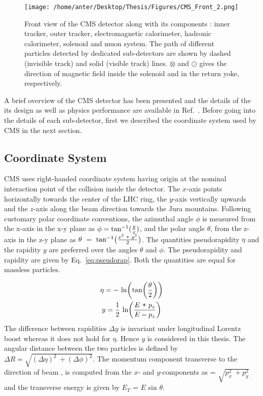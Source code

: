 \begin{figure}[!h]
\begin{center} 
\hspace*{-15mm}
\texttt{[image: /home/anter/Desktop/Thesis/Figures/CMS\_Front\_2.png]}
\caption{Front view of the CMS detector \cite{Ball:2007zza} along with its components : inner tracker, outer tracker, electromagnetic calorimeter, hadronic calorimeter, solenoid and muon system. The path of different particles detected by dedicated sub-detectors are shown by dashed (invisible track) and solid (visible track) lines. $\otimes$ and $\odot$ gives the direction of magnetic field inside the solenoid and in the return yoke, respectively.}
\label{fig:CMS_front}
\end{center}
\end{figure}

A brief overview of the CMS detector has been presented and the details of the its design as well as physics performance are available in Ref.~\cite{Bayatian:2006nff,Ball:2007zza}. Before going into the details of each sub-detector, first we described the coordinate system used by CMS in the next section.

\subsection{Coordinate System}
CMS uses right-handed coordinate system having origin at the nominal interaction point of the collision inside the detector. The $x$-axis points horizontally towards the center of the LHC ring, the $y$-axis vertically upwards and the $z$-axis along the beam direction towards the Jura mountains. Following customary polar coordinate conventions, the
azimuthal angle $\phi$ is measured from the x-axis in the x-y plane as $\phi = {\rm tan^{-1}}(\frac{y}{x})$, and the polar angle $\theta$, from the z-axis in the z-y plane as $\theta~=~{\rm tan^{-1}}\big(\frac{x^2~\plus y^2}{2}\big)$. The quantities pseudorapidity $\eta$ and the rapidity $y$ are preferred over the angles $\theta$ and $\phi$. The pseudorapidity and rapidity are given by Eq.~\ref{eq:pseudorap}. Both the quantities are equal for massless particles.

\begin{equation}
\begin{gathered}
\eta = -~{\rm ln}\bigg({\rm tan}\bigg(\frac{\theta}{2}\bigg)\bigg)\\
y = \frac{1}{2}~{\rm ln} \bigg(\frac{E~\plus p_z}{E - p_z} \bigg)
\end{gathered}
\label{eq:pseudorap}
\end{equation}
The difference between rapidities $\Delta y$ is invariant under longitudinal Lorentz boost whereas it does not hold for $\eta$. Hence $y$ is considered in this thesis. The angular distance between the two particles is defined by $\Delta R = \sqrt{(\Delta \eta)^2~\plus (\Delta \phi)^2}$. The momentum component transverse to the direction of beam \pt, is computed from the $x$- and $y$-components as \pt = $\sqrt{p^2_x~\plus p^2_y}$ and the transverse energy is given by $E_T$ = $E$ sin $\theta$.
 
